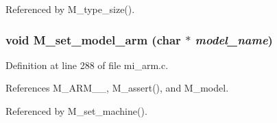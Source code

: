 Referenced by M\_\-type\_\-size().
\subsubsection{\setlength{\rightskip}{0pt plus 5cm}void M\_\-set\_\-model\_\-arm (char $\ast$ {\em model\_\-name})}\label{mi__arm_8c_df66c76f9b00fb8b9b2a1d23994befee}




Definition at line 288 of file mi\_\-arm.c.

References M\_\-ARM\_\_, M\_\-assert(), and M\_\-model.

Referenced by M\_\-set\_\-machine().